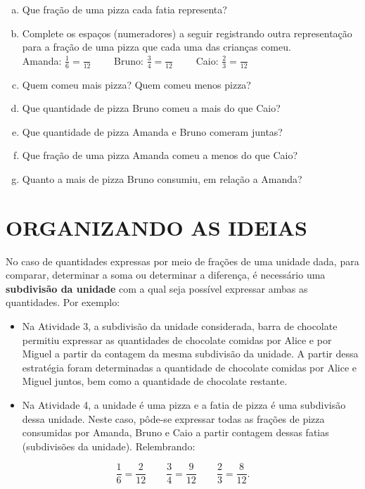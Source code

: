 \begin{enumerate}[a)]
\item  Que fração de uma pizza cada fatia representa?
 \item Complete os espaços (numeradores) a seguir registrando outra representação para a fração de uma pizza que cada uma das crianças comeu.\\ Amanda: $\frac{1}{6} =\frac{}{12}  \quad \quad$ Bruno: $\frac{3}{4} =\frac{}{12} \quad \quad$ Caio: $\frac{2}{3} =\frac{}{12}$ 
 \item Quem comeu mais pizza? Quem comeu menos pizza?
 \item Que quantidade de pizza Bruno comeu a mais do que Caio?
 \item Que quantidade de pizza Amanda e Bruno comeram juntas?
  \item Que fração de uma pizza Amanda comeu a menos do que Caio?
  \item Quanto a mais de pizza Bruno consumiu, em relação a Amanda?
\end{enumerate}


\section{ORGANIZANDO AS IDEIAS }

No caso de quantidades expressas por meio de frações de uma unidade dada, para comparar, determinar a soma ou determinar a diferença, é necessário uma {\bf subdivisão da unidade} com a qual seja possível expressar ambas as quantidades. Por exemplo:
\begin{itemize} %
  \item     Na Atividade 3, a subdivisão da unidade considerada, barra de chocolate permitiu expressar as quantidades de chocolate comidas por Alice e por Miguel a partir da contagem da mesma subdivisão da unidade. A partir dessa estratégia foram determinadas a quantidade de chocolate comidas por Alice e Miguel juntos, bem como a quantidade de chocolate restante. 
  \item     Na Atividade 4, a unidade é uma pizza e a fatia de pizza é uma subdivisão dessa unidade. Neste caso, pôde-se expressar todas as frações de pizza consumidas por Amanda, Bruno e Caio a partir contagem dessas fatias (subdivisões da unidade). Relembrando:
\end{itemize} %

$$\dfrac{1}{6} = \dfrac{2}{12} 	\quad \quad \dfrac{3}{4} = \dfrac{9}{12} \quad \quad \dfrac{2}{3} = \dfrac{8}{12}.$$


